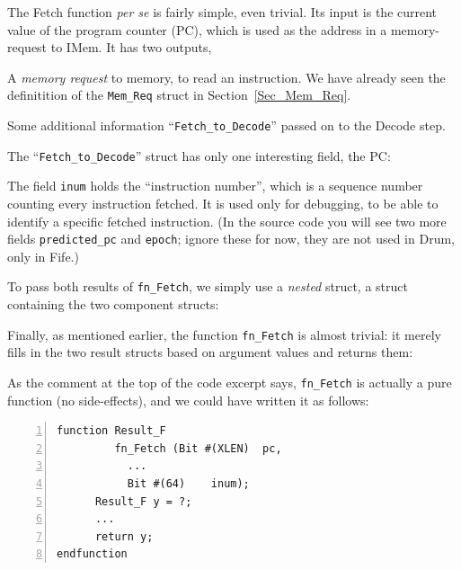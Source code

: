 \label{Sec_fn_Fetch}


The Fetch function \emph{per se} is fairly simple, even trivial.  Its
input is the current value of the program counter (PC), which is used
as the address in a memory-request to IMem.  It has two outputs,

\begin{tightlist}

 \item A \emph{memory request} to memory, to read an instruction.  We
       have already seen the definitition of the \verb|Mem_Req| struct
       in Section~\ref{Sec_Mem_Req}.

 \item Some additional information ``\verb|Fetch_to_Decode|'' passed
       on to the Decode step.

\end{tightlist}

The ``\verb|Fetch_to_Decode|'' struct has only one interesting field,
the PC:



The field \verb|inum| holds the ``instruction number'', which is a
sequence number counting every instruction fetched.  It is used only
for debugging, to be able to identify a specific fetched instruction.
(In the source code you will see two more fields \verb|predicted_pc|
and \verb|epoch|; ignore these for now, they are not used in Drum,
only in Fife.)


To pass both results of \verb|fn_Fetch|, we simply use a \emph{nested}
struct, {\ie} a struct containing the two component structs:



Finally, as mentioned earlier, the function \verb|fn_Fetch| is almost
trivial: it merely fills in the two result structs based on argument
values and returns them:



As the comment at the top of the code excerpt says, \verb|fn_Fetch| is
actually a pure function (no side-effects), and we could have written
it as follows:

{\small
\begin{Verbatim}[frame=single, numbers=left]
function Result_F
         fn_Fetch (Bit #(XLEN)  pc,
		   ...
		   Bit #(64)    inum);
      Result_F y = ?;
      ...
      return y;
endfunction
\end{Verbatim}
}

